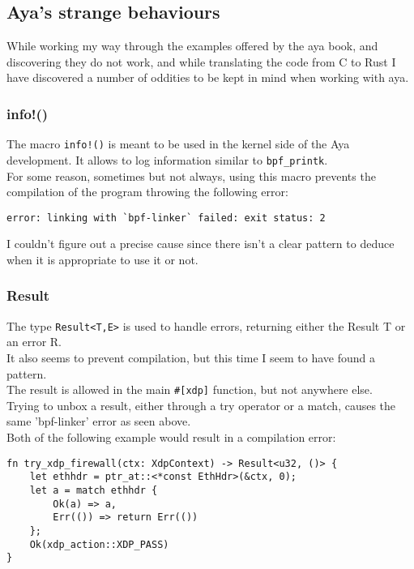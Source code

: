 \documentclass{article}
\begin{document}
\subsection*{Aya's strange behaviours}
While working my way through the examples offered by the aya book, and discovering they do not work, and while translating the code from C to Rust I have discovered a number of oddities to be kept in mind when working with aya.\\

\subsubsection*{info!()}
The macro \texttt{info!()} is meant to be used in the kernel side of the Aya development. It allows to log information similar to \texttt{bpf_printk}.\\
For some reason, sometimes but not always, using this macro prevents the compilation of the program throwing the following error:

\begin{verbatim}
error: linking with `bpf-linker` failed: exit status: 2
\end{verbatim}

I couldn't figure out a precise cause since there isn't a clear pattern to deduce when it is appropriate to use it or not.

\subsubsection*{Result}
The type \texttt{Result<T,E>} is used to handle errors, returning either the Result T or an error R.\\
It also seems to prevent compilation, but this time I seem to have found a pattern.\\
The result is allowed in the main \texttt{#[xdp]} function, but not anywhere else.\\
Trying to unbox a result, either  through a try operator or a match, causes the same 'bpf-linker' error as seen above.\\
Both of the following example would result in a compilation error:

\begin{verbatim}
fn try_xdp_firewall(ctx: XdpContext) -> Result<u32, ()> {
    let ethhdr = ptr_at::<*const EthHdr>(&ctx, 0);
    let a = match ethhdr {
        Ok(a) => a,
        Err(()) => return Err(())
    };
    Ok(xdp_action::XDP_PASS)
}
\end{verbatim}
\end{document}

